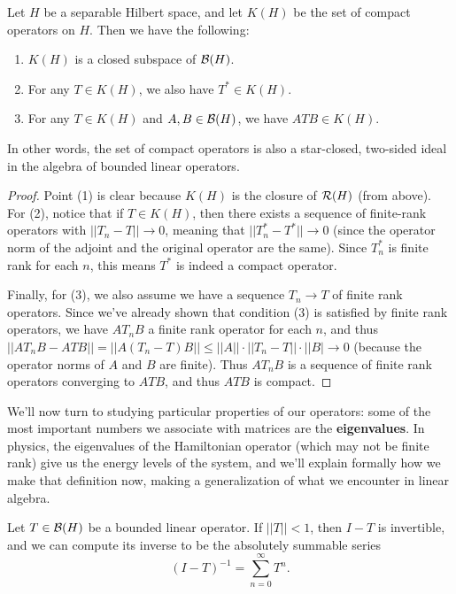 \begin{theorem}
Let $H$ be a separable Hilbert space, and let $K(H)$ be the set of compact operators on $H$. Then we have the following:
\begin{enumerate}
\item $K(H)$ is a closed subspace of $\mathcal{B}(H)$.
\item For any $T \in K(H)$, we also have $T^\ast \in K(H)$.
\item For any $T \in K(H)$ and $A, B \in \mathcal{B}(H)$, we have $ATB \in K(H)$.
\end{enumerate}
\end{theorem}

In other words, the set of compact operators is also a star-closed, two-sided ideal in the algebra of bounded linear operators.
 
\begin{proof}
Point (1) is clear because $K(H)$ is the closure of $\mathcal{R}(H)$ (from above). For (2), notice that if $T \in K(H)$, then there exists a sequence of finite-rank operators with $||T_n - T|| \to 0$, meaning that $||T_n^\ast - T^\ast|| \to 0$ (since the operator norm of the adjoint and the original operator are the same). Since $T_n^\ast$ is finite rank for each $n$, this means $T^\ast$ is indeed a compact operator.

Finally, for (3), we also assume we have a sequence $T_n \to T$ of finite rank operators. Since we've already shown that condition (3) is satisfied by finite rank operators, we have $AT_nB$ a finite rank operator for each $n$, and thus $||AT_nB - ATB|| = ||A(T_n-T)B|| \le ||A|| \cdot ||T_n-T|| \cdot ||B| \to 0$ (because the operator norms of $A$ and $B$ are finite). Thus $AT_nB$ is a sequence of finite rank operators converging to $ATB$, and thus $ATB$ is compact.
\end{proof}

We'll now turn to studying particular properties of our operators: some of the most important numbers we associate with matrices are the \textbf{eigenvalues}. In physics, the eigenvalues of the Hamiltonian operator (which may not be finite rank) give us the energy levels of the system, and we'll explain formally how we make that definition now, making a generalization of what we encounter in linear algebra. 

\begin{proposition}\label{linopinvbound}
Let $T \in \mathcal{B}(H)$ be a bounded linear operator. If $||T|| < 1$, then $I - T$ is invertible, and we can compute its inverse to be the absolutely summable series 
\[
    (I-T)^{-1} = \sum_{n=0}^{\infty} T^n.
\]
\end{proposition}

